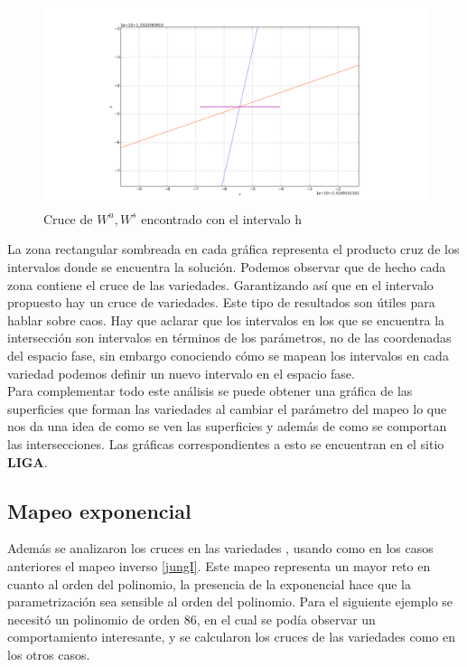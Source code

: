\begin{figure}[H]
\centering
\includegraphics[scale=0.4]{cruce8}
\caption{Cruce de $W^{u},W^{s}$ encontrado con el intervalo h }
\label{cruce8}
\end{figure}


La zona rectangular sombreada en cada gráfica representa el producto cruz de los intervalos donde se encuentra la solución. Podemos observar que de hecho cada zona contiene el cruce de las variedades. Garantizando así que en el intervalo propuesto hay un cruce de variedades. Este tipo de resultados son útiles para hablar sobre caos. Hay que aclarar que los intervalos en los que se encuentra la intersección son intervalos en términos de los parámetros, no de las coordenadas del espacio fase, sin embargo conociendo cómo se mapean los intervalos en cada variedad podemos definir un nuevo intervalo en el espacio fase. \\


Para complementar todo este análisis se puede obtener una gráfica de las superficies que forman las variedades al cambiar el parámetro del mapeo lo que nos da una idea de como se ven las superficies y además de como se comportan las intersecciones. Las gráficas correspondientes a esto se encuentran en el sitio \textbf{LIGA}.
\subsection{Mapeo exponencial}
Además se analizaron los cruces en las variedades , usando como en los casos anteriores el mapeo inverso \ref{jungI}. Este mapeo representa un mayor reto en cuanto al orden del polinomio, la presencia de la exponencial hace que la parametrización sea sensible al orden del polinomio. Para el siguiente ejemplo se necesitó un polinomio de orden 86, en el cual se podía observar un comportamiento interesante, y se calcularon los cruces de las variedades como en los otros casos. 



